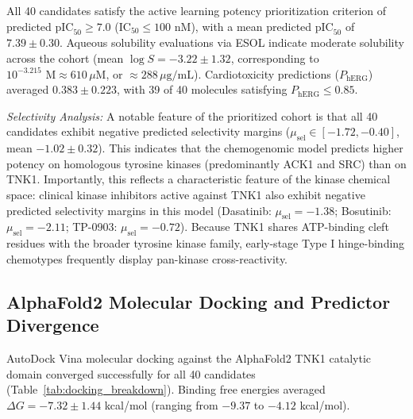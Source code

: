 \documentclass[journal]{IEEEtran}
\begin{document}
All 40 candidates satisfy the active learning potency prioritization criterion of predicted $\text{pIC}_{50} \ge 7.0$ ($\text{IC}_{50} \le 100$ nM), with a mean predicted $\text{pIC}_{50}$ of $7.39 \pm 0.30$. Aqueous solubility evaluations via ESOL indicate moderate solubility across the cohort (mean $\log S = -3.22 \pm 1.32$, corresponding to $10^{-3.215}\text{ M} \approx 610\,\mu\text{M}$, or $\approx 288\,\mu\text{g/mL}$). Cardiotoxicity predictions ($P_{\text{hERG}}$) averaged $0.383 \pm 0.223$, with 39 of 40 molecules satisfying $P_{\text{hERG}} \le 0.85$.

\textit{Selectivity Analysis:} A notable feature of the prioritized cohort is that all 40 candidates exhibit negative predicted selectivity margins ($\mu_{\text{sel}} \in [-1.72, -0.40]$, mean $-1.02 \pm 0.32$). This indicates that the chemogenomic model predicts higher potency on homologous tyrosine kinases (predominantly ACK1 and SRC) than on TNK1. Importantly, this reflects a characteristic feature of the kinase chemical space: clinical kinase inhibitors active against TNK1 also exhibit negative predicted selectivity margins in this model (Dasatinib: $\mu_{\text{sel}} = -1.38$; Bosutinib: $\mu_{\text{sel}} = -2.11$; TP-0903: $\mu_{\text{sel}} = -0.72$). Because TNK1 shares ATP-binding cleft residues with the broader tyrosine kinase family, early-stage Type I hinge-binding chemotypes frequently display pan-kinase cross-reactivity.

\subsection{AlphaFold2 Molecular Docking and Predictor Divergence}
AutoDock Vina molecular docking against the AlphaFold2 TNK1 catalytic domain converged successfully for all 40 candidates (Table~\ref{tab:docking_breakdown}). Binding free energies averaged $\Delta G = -7.32 \pm 1.44$ kcal/mol (ranging from $-9.37$ to $-4.12$ kcal/mol).
\end{document}
